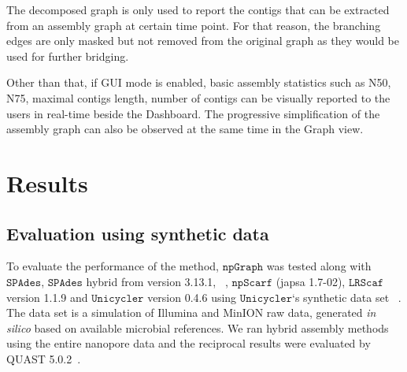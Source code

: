 \documentclass[10pt,letterpaper]{article}
\newcommand{\npscarf}{$\mathtt{npScarf}$}
\newcommand{\npgraph}{$\mathtt{npGraph}$}
\newcommand{\unicycler}{$\mathtt{Unicycler}$}
\newcommand{\spades}{$\mathtt{SPAdes}$}
\newcommand{\lrscaf}{$\mathtt{LRScaf}$}
\begin{document}
The decomposed graph is only used to report the contigs that can be extracted from an assembly graph at certain time point. For that reason, the branching edges are only masked but not removed from the original graph as they would be used for further bridging.

Other than that, if GUI mode is enabled, basic assembly statistics such as N50, N75, maximal contigs length, number of contigs can be visually reported to the users in real-time beside the Dashboard. The progressive simplification of the assembly graph can also be observed at the same time in the Graph view.


\section*{Results}
\subsection*{Evaluation using synthetic data}
To evaluate the performance of the method, \npgraph{} was tested along with \spades{}, \spades{} hybrid from version 3.13.1, ~\cite{AntipovKM2015}, \npscarf{} (japsa 1.7-02), \lrscaf{} version 1.1.9 and \unicycler{} version 0.4.6 using \unicycler{}`s synthetic data set~ \cite{Wick2017unicycler} . 
The data set is a simulation of Illumina and MinION raw data, generated \emph{in silico} based on available microbial references.
We ran hybrid assembly methods using the entire nanopore data and the reciprocal results were evaluated by QUAST 5.0.2~\cite{Mikheenko2018quast5}. 
\end{document}
